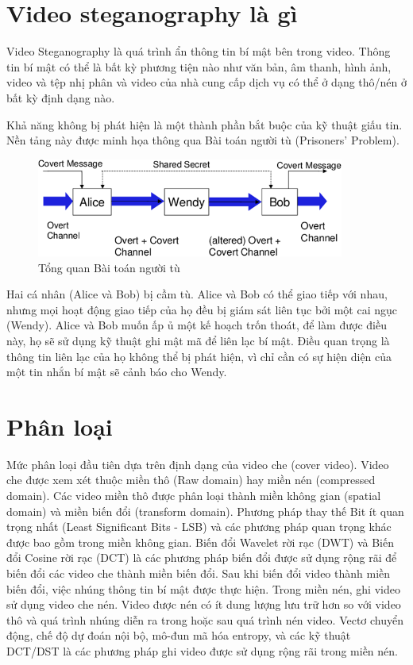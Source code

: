 \section{Video steganography là gì}
Video Steganography là quá trình ẩn thông tin bí mật bên trong video. Thông tin bí mật có thể là bất kỳ phương tiện nào như văn bản, âm thanh, hình ảnh, video và tệp nhị phân và video của nhà cung cấp dịch vụ có thể ở dạng thô/nén ở bất kỳ định dạng nào.

Khả năng không bị phát hiện là một thành phần bắt buộc của kỹ thuật giấu tin. Nền tảng này được minh họa thông qua Bài toán người tù (Prisoners’ Problem).

\begin{figure}[!h]
    \centering
    \includegraphics[width=0.9\textwidth]{graphics/chapter-1/Prisoner'problem.png}
    \caption{Tổng quan Bài toán người tù}
    \label{fig:prisonerProblem}
\end{figure}

Hai cá nhân (Alice và Bob) bị cầm tù. Alice và Bob có thể giao tiếp với nhau, nhưng mọi hoạt động giao tiếp của họ đều bị giám sát liên tục bởi một cai ngục (Wendy). Alice và Bob muốn ấp ủ một kế hoạch trốn thoát, để làm được điều này, họ sẽ sử dụng kỹ thuật ghi mật mã để liên lạc bí mật. Điều quan trọng là thông tin liên lạc của họ không thể bị phát hiện, vì chỉ cần có sự hiện diện của một tin nhắn bí mật sẽ cảnh báo cho Wendy.

\section{Phân loại}
Mức phân loại đầu tiên dựa trên định dạng của video che (cover video). Video che được xem xét thuộc miền thô (Raw domain) hay miền nén (compressed domain). Các video miền thô được phân loại thành miền không gian (spatial domain) và miền biến đổi (transform domain). Phương pháp thay thế Bit ít quan trọng nhất (Least Significant Bits - LSB) và các phương pháp quan trọng khác được bao gồm trong miền không gian. Biến đổi Wavelet rời rạc (DWT) và Biến đổi Cosine rời rạc (DCT) là các phương pháp biến đổi được sử dụng rộng rãi để biến đổi các video che thành miền biến đổi. Sau khi biến đổi video thành miền biến đổi, việc nhúng thông tin bí mật được thực hiện. Trong miền nén, ghi video sử dụng video che nén. Video được nén có ít dung lượng lưu trữ hơn so với video thô và quá trình nhúng diễn ra trong hoặc sau quá trình nén video. Vectơ chuyển động, chế độ dự đoán nội bộ, mô-đun mã hóa entropy, và các kỹ thuật DCT/DST là các phương pháp ghi video được sử dụng rộng rãi trong miền nén. 

